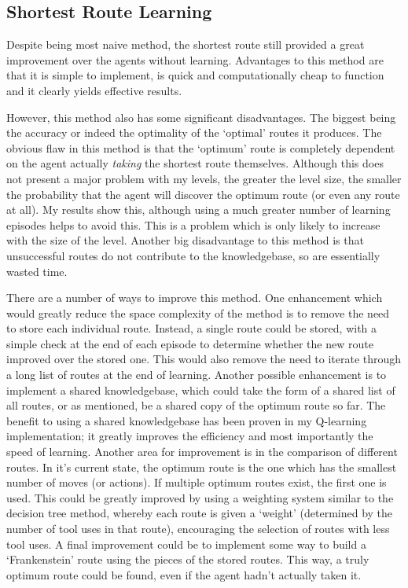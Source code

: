\documentclass[a4paper,oneside]{report}
\begin{document}
\subsection{Shortest Route Learning}

Despite being most naive method, the shortest route still provided a great improvement over the agents without learning. Advantages to this method are that it is simple to implement, is quick and computationally cheap to function and it clearly yields effective results. 

However, this method also has some significant disadvantages. The biggest being the accuracy or indeed the optimality of the `optimal' routes it produces. The obvious flaw in this method is that the `optimum' route is completely dependent on the agent actually \emph{taking} the shortest route themselves. Although this does not present a major problem with my levels, the greater the level size, the smaller the probability that the agent will discover the optimum route (or even any route at all). My results show this, although using a much greater number of learning episodes helps to avoid this. This is a problem which is only likely to increase with the size of the level. Another big disadvantage to this method is that unsuccessful routes do not contribute to the knowledgebase, so are essentially wasted time. 

There are a number of ways to improve this method. One enhancement which would greatly reduce the space complexity of the method is to remove the need to store each individual route. Instead, a single route could be stored, with a simple check at the end of each episode to determine whether the new route improved over the stored one. This would also remove the need to iterate through a long list of routes at the end of learning. Another possible enhancement is to implement a shared knowledgebase, which could take the form of a shared list of all routes, or as mentioned, be a shared copy of the optimum route so far. The benefit to using a shared knowledgebase has been proven in my Q-learning implementation; it greatly improves the efficiency and most importantly the speed of learning. Another area for improvement is in the comparison of different routes. In it's current state, the optimum route is the one which has the smallest number of moves (or actions). If multiple optimum routes exist, the first one is used. This could be greatly improved by using a weighting system similar to the decision tree method, whereby each route is given a `weight' (determined by the number of tool uses in that route), encouraging the selection of routes with less tool uses. A final improvement could be to implement some way to build a `Frankenstein' route using the pieces of the stored routes. This way, a truly optimum route could be found, even if the agent hadn't actually taken it.
\end{document}
